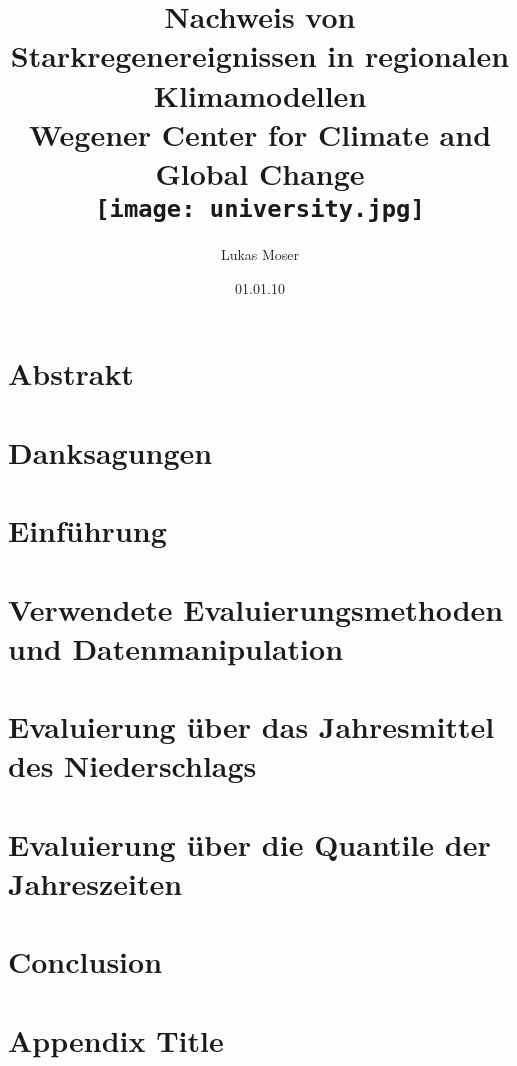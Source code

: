 \documentclass[12pt,twoside]{report}
\title{
	{Nachweis von Starkregenereignissen in regionalen Klimamodellen}\\
	{\large Wegener Center for Climate and Global Change}\\
	{\texttt{[image: university.jpg]}}
}
\author{Lukas Moser}
\date{01.01.10}
\begin{document}
	\maketitle

	
	\chapter*{Abstrakt}
	
	
	\chapter*{Danksagungen}
	
	\tableofcontents
	
	\chapter{Einführung}
	\label{chap:intro}
	
	
	\chapter{Verwendete Evaluierungsmethoden und Datenmanipulation}
	\label{chap:methods}
	
	
	\chapter{Evaluierung über das Jahresmittel des Niederschlags}
	\label{chap:mean}
	
	
	\chapter{Evaluierung über die Quantile der Jahreszeiten}
	\label{chap:quantile}
	
	\chapter{Conclusion}
	\label{chap:conclusion}
	
	
	\appendix
	\chapter{Appendix Title}
	
	\printbibliography
\end{document}
